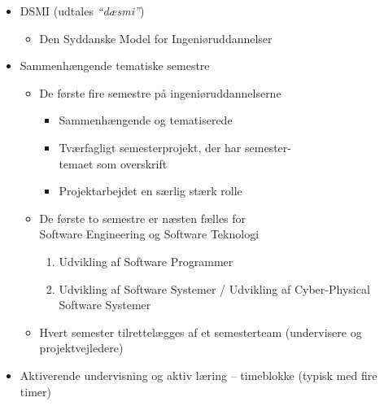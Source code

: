 \documentclass[t, aspectratio=169]{beamer}
\newcommand{\quoted}[1]{\textsl{``#1''}}
\begin{document}
\begin{frame}[fragile]
  \vspace{0mm}
  \begin{itemize}
    \pause
    \item DSMI (udtales \quoted{dæsmi})
      \begin{itemize}
        \item Den Syddanske Model for Ingeniøruddannelser
      \end{itemize}
    \pause
    \item Sammenhængende tematiske semestre
      \begin{itemize}
        \item De første fire semestre på ingeniøruddannelserne
          \begin{itemize}
            \item Sammenhængende og tematiserede
            \item Tværfagligt semesterprojekt, der har semester-\\temaet som overskrift
            \item Projektarbejdet en særlig stærk rolle
          \end{itemize}
        \item De første to semestre er næsten fælles for\\Software Engineering og Software Teknologi
          \begin{enumerate}
            \item Udvikling af Software Programmer
            \item Udvikling af Software Systemer / Udvikling af Cyber-Physical Software Systemer
          \end{enumerate}
        \item Hvert semester tilrettelægges af et semesterteam (undervisere og projektvejledere)
      \end{itemize}
    \pause
    \item Aktiverende undervisning og aktiv læring – timeblokke (typisk med fire timer)
  \end{itemize}
\end{frame}
\end{document}
